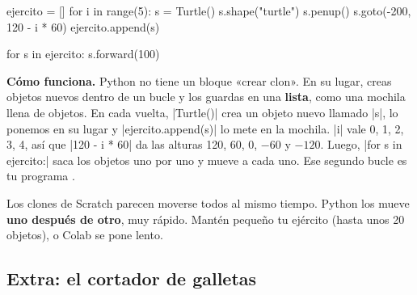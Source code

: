 \begin{tcbraster}[raster columns=2, raster equal height=rows, raster column skip=12pt, raster valign=center, raster force size=false, raster column 1/.style={add to width=-2cm}, raster column 2/.style={add to width=2cm}]
\begin{tcolorbox}[colback=white, colframe=white, boxrule=0pt, valign=center]
\begin{scratch}[scale=0.83]
\end{scratch}
\par\smallskip
\begin{scratch}
\end{scratch}
\end{tcolorbox}
\begin{code}
ejercito = []
for i in range(5):
    s = Turtle()
    s.shape("turtle")
    s.penup()
    s.goto(-200, 120 - i * 60)
    ejercito.append(s)

for s in ejercito:
    s.forward(100)
\end{code}
\end{tcbraster}

\textbf{Cómo funciona.} Python no tiene un bloque «crear clon». En su lugar, creas objetos nuevos dentro de un bucle y los guardas en una \textbf{lista}, como una mochila llena de objetos. En cada vuelta, \py|Turtle()| crea un objeto nuevo llamado \py|s|, lo ponemos en su lugar y \py|ejercito.append(s)| lo mete en la mochila. \py|i| vale 0, 1, 2, 3, 4, así que \py|120 - i * 60| da las alturas 120, 60, 0, $-60$ y $-120$. Luego, \py|for s in ejercito:| saca los objetos uno por uno y mueve a cada uno. Ese segundo bucle es tu programa .

\begin{think}
Los clones de Scratch parecen moverse todos al mismo tiempo. Python los mueve \textbf{uno después de otro}, muy rápido. Mantén pequeño tu ejército (hasta unos 20 objetos), o Colab se pone lento.
\end{think}

\subsection*{Extra: el cortador de galletas}

